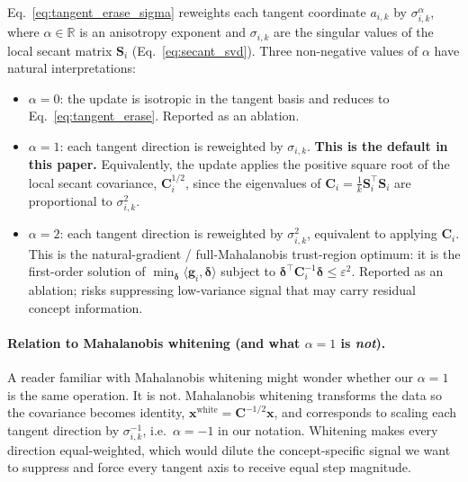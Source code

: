Eq.~\ref{eq:tangent_erase_sigma} reweights each tangent coordinate $a_{i,k}$ by $\sigma_{i,k}^{\alpha}$, where $\alpha \in \mathbb{R}$ is an anisotropy exponent and $\sigma_{i,k}$ are the singular values of the local secant matrix $\mathbf{S}_i$ (Eq.~\ref{eq:secant_svd}). Three non-negative values of $\alpha$ have natural interpretations:
\begin{itemize}
\item \textbf{$\alpha = 0$}: the update is isotropic in the tangent basis and reduces to Eq.~\ref{eq:tangent_erase}. Reported as an ablation.
\item \textbf{$\alpha = 1$}: each tangent direction is reweighted by $\sigma_{i,k}$. \textbf{This is the default in this paper.} Equivalently, the update applies the positive square root of the local secant covariance, $\mathbf{C}_i^{1/2}$, since the eigenvalues of $\mathbf{C}_i = \tfrac{1}{k} \mathbf{S}_i^\top \mathbf{S}_i$ are proportional to $\sigma_{i,k}^2$.
\item \textbf{$\alpha = 2$}: each tangent direction is reweighted by $\sigma_{i,k}^2$, equivalent to applying $\mathbf{C}_i$. This is the natural-gradient / full-Mahalanobis trust-region optimum: it is the first-order solution of $\min_{\boldsymbol\delta} \langle \mathbf{g}_i, \boldsymbol\delta \rangle$ subject to $\boldsymbol\delta^\top \mathbf{C}_i^{-1} \boldsymbol\delta \le \varepsilon^2$. Reported as an ablation; risks suppressing low-variance signal that may carry residual concept information.
\end{itemize}

\paragraph{Relation to Mahalanobis whitening (and what $\alpha = 1$ is \emph{not}).}
A reader familiar with Mahalanobis whitening might wonder whether our $\alpha = 1$ is the same operation. It is not. Mahalanobis whitening transforms the data so the covariance becomes identity, $\mathbf{x}^{\mathrm{white}} = \mathbf{C}^{-1/2} \mathbf{x}$, and corresponds to scaling each tangent direction by $\sigma_{i,k}^{-1}$, i.e.\ $\alpha = -1$ in our notation. Whitening makes every direction equal-weighted, which would dilute the concept-specific signal we want to suppress and force every tangent axis to receive equal step magnitude.

